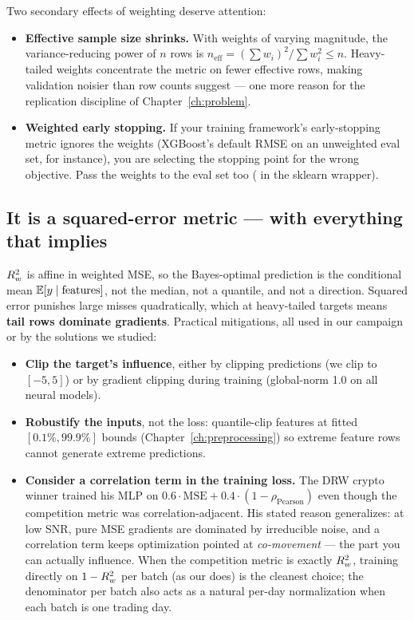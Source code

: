 Two secondary effects of weighting deserve attention:

\begin{itemize}
\item \textbf{Effective sample size shrinks.} With weights of varying
  magnitude, the variance-reducing power of $n$ rows is
  $n_{\text{eff}} = (\sum w_i)^2 / \sum w_i^2 \le n$. Heavy-tailed weights
  concentrate the metric on fewer effective rows, making validation noisier
  than row counts suggest --- one more reason for the replication discipline
  of Chapter~\ref{ch:problem}.
\item \textbf{Weighted early stopping.} If your training framework's
  early-stopping metric ignores the weights (XGBoost's default RMSE on an
  unweighted eval set, for instance), you are selecting the stopping point
  for the wrong objective. Pass the weights to the eval set too
  ( in the sklearn wrapper).
\end{itemize}

\subsection{It is a squared-error metric --- with everything that implies}

$R^2_{w}$ is affine in weighted MSE, so the Bayes-optimal prediction is the
conditional mean $\mathbb{E}[y \mid \text{features}]$, not the median, not a
quantile, and not a direction. Squared error punishes large misses
quadratically, which at heavy-tailed targets means \textbf{tail rows
dominate gradients}. Practical mitigations, all used in our campaign or by
the solutions we studied:

\begin{itemize}
\item \textbf{Clip the target's influence}, either by clipping predictions
  (we clip to $[-5,5]$) or by gradient clipping during training
  (global-norm 1.0 on all neural models).
\item \textbf{Robustify the inputs}, not the loss: quantile-clip features at
  fitted $[0.1\%, 99.9\%]$ bounds (Chapter~\ref{ch:preprocessing}) so
  extreme feature rows cannot generate extreme predictions.
\item \textbf{Consider a correlation term in the training loss.} The DRW
  crypto winner trained his MLP on
  $0.6\cdot\mathrm{MSE} + 0.4\cdot(1-\rho_{\mathrm{Pearson}})$ even though
  the competition metric was correlation-adjacent. His stated reason
  generalizes: at low SNR, pure MSE gradients are dominated by irreducible
  noise, and a correlation term keeps optimization pointed at
  \emph{co-movement} --- the part you can actually influence. When the
  competition metric is exactly $R^2_{w}$, training directly on
  $1-R^2_{w}$ per batch (as our  does) is the cleanest
  choice; the denominator per batch also acts as a natural per-day
  normalization when each batch is one trading day.
\end{itemize}

